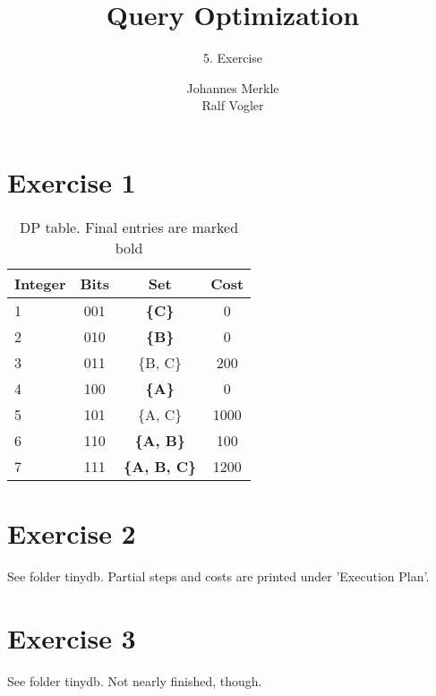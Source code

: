 \documentclass[11pt,a4paper]{scrartcl}
\begin{document}
\author{Johannes Merkle\\Ralf Vogler}
\title{Query Optimization}
\subtitle{5. Exercise}

\maketitle

\section*{Exercise 1}


\begin{table}[H]
  \caption{DP table. Final entries are marked bold}
  \begin{center}
 \begin{tabular}{l|c|c|c}
Integer & Bits & Set & Cost\\
\hline
1 & 001 &  \textbf{\{C\}} 		& 0\\
2 & 010 &  \textbf{\{B\}} 		& 0\\
3 & 011 & \{B, C\} 				& 200\\
4 & 100 &  \textbf{\{A\}} 		& 0\\
5 & 101 & \{A, C\} 				& 1000\\
6 & 110 &  \textbf{\{A, B\}} 		& 100\\
7 & 111 &  \textbf{\{A, B, C\}} 	& 1200\\
 \end{tabular}  
  \end{center}
 \label{tab:gp1}
\end{table}

\section*{Exercise 2}
See folder tinydb. Partial steps and costs are printed under 'Execution Plan'.

\section*{Exercise 3}

See folder tinydb. Not nearly finished, though.
\end{document}
